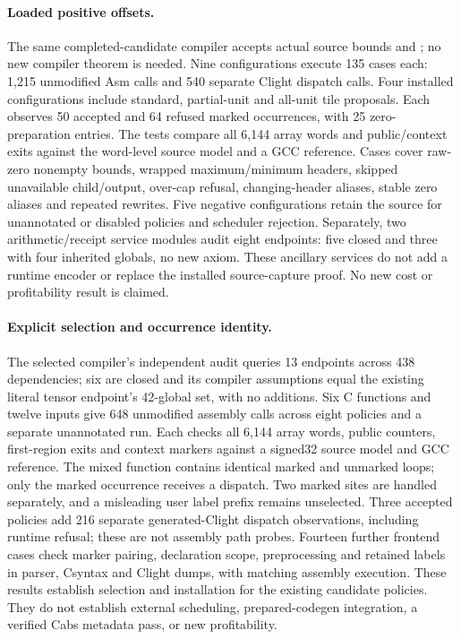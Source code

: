 \paragraph{Loaded positive offsets.}
The same completed-candidate compiler accepts actual source bounds
 and ; no new compiler theorem is needed. Nine
configurations execute 135 cases each: 1,215 unmodified Asm calls and 540
separate Clight dispatch calls. Four installed configurations include standard,
partial-unit and all-unit tile proposals. Each observes 50 accepted and 64
refused marked occurrences, with 25 zero-preparation entries. The tests compare
all 6,144 array words and public/context exits against the word-level source
model and a GCC  reference. Cases cover raw-zero nonempty
bounds, wrapped maximum/minimum headers, skipped unavailable child/output,
over-cap refusal, changing-header aliases, stable zero aliases and repeated
rewrites. Five negative configurations retain the source for unannotated or
disabled policies and scheduler rejection. Separately, two arithmetic/receipt service modules audit
eight endpoints: five closed and three with four inherited globals, no new
axiom. These ancillary services do not add a runtime encoder or replace the
installed source-capture proof. No new cost or profitability result is claimed.


\paragraph{Explicit selection and occurrence identity.}
The selected compiler's independent audit queries 13 endpoints across 438
dependencies; six are closed and its compiler assumptions equal the existing
literal tensor endpoint's 42-global set, with no additions. Six C functions and
twelve inputs give 648 unmodified assembly calls across eight policies and a
separate unannotated run. Each checks all 6,144 array words, public counters,
first-region exits and context markers against a signed32 source model and GCC
reference. The mixed function contains identical marked and unmarked loops;
only the marked occurrence receives a dispatch. Two marked sites are handled
separately, and a misleading user label prefix remains unselected. Three
accepted policies add 216 separate generated-Clight dispatch observations,
including runtime refusal; these are not assembly path probes.
Fourteen further frontend cases check marker pairing, declaration scope,
preprocessing and retained labels in parser, Csyntax and Clight dumps, with
matching assembly execution. These results establish selection and installation
for the existing candidate policies. They do not establish external scheduling,
prepared-codegen integration, a verified Cabs metadata pass, or new profitability.

